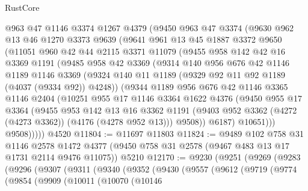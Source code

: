 \begin{lexlean}{RustCore}
\begin{coremodule}
    @963
    @47
    @1146
    @3374
    @1267
    @4379
    (@9450
      @963
      @47
      @3374
      (@9630
        @962
        @13
        @46
        @1270
        @3373
        @9639
        (@9641
          @961
          @13
          @45
          @1887
          @3372
          @9650
          (@11051
            @960
            @42
            @44
            @2115
            @3371
            @11079
            (@9455
              @958
              @142
              @42
              @16
              @3369
              @1191
              (@9485
                @958
                @42
                @3369
                (@9314
                  @140
                  @956
                  @676
                  @42
                  @1146
                  @1189
                  @1146
                  @3369
                  (@9324 @140 @11 @1189 (@9329 @92 @11 @92 @1189 (@4037 (@9334 @92)) @4248))
                  (@9344
                    @1189
                    @956
                    @676
                    @42
                    @1146
                    @3365
                    @1146
                    @2404
                    (@10251
                      @955
                      @17
                      @1146
                      @3364
                      @1622
                      @4376
                      (@9450
                        @955
                        @17
                        @3364
                        (@9455
                          @953
                          @142
                          @13
                          @16
                          @3362
                          @1191
                          (@9403 @952 @3362 (@4272 (@4273 @3362)) (@4176 (@4278 @952 @13)))
                          @9508))
                      @6187)
                    @10651)))
              @9508)))))
    @4520
@11804 := @11697 @11803
@11824 := @9489
    @102
    @758
    @31
    @1146
    @2578
    @1472
    @4377
    (@9450 @758 @31 @2578 (@9467 @483 @13 @17 @1731 @2114 @9476 @11075))
    @5210
@12170 := @9230
    (@9251
      (@9269
        (@9283
          (@9296
            (@9307
              (@9311
                (@9340
                  (@9352
                    (@9430
                      (@9557
                        (@9612
                          (@9719
                            (@9774
                              (@9854
                                (@9909
                                  (@10011
                                    (@10070
                                      (@10146

\end{coremodule}
\end{lexlean}

